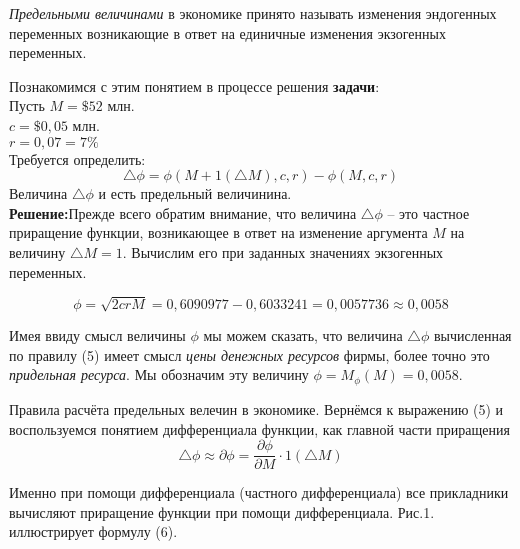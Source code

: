 \documentclass[12pt,a4paper]{article}
\begin{document}
\textit{Предельными величинами} в экономике принято называть изменения эндогенных переменных возникающие в ответ на единичные изменения экзогенных переменных. 

Познакомимся с этим понятием в процессе решения \textbf{задачи}:\\
Пусть $M = \$52$ млн.\\
$c = \$ 0,05$ млн. \\
$r = 0,07 = 7\%$\\
Требуется определить: \\
\begin{equation}
\triangle \phi = \phi(M+1(\triangle M), c, r) - \phi(M,c,r)
\end{equation}
Величина $\triangle \phi$ и есть предельный величинина.\\
\textbf{Решение:}Прежде всего обратим внимание, что величина $\triangle \phi$ -- это частное приращение функции, возникающее в ответ на изменение аргумента $M$ на величину $\triangle M = 1$. Вычислим его при заданных значениях экзогенных переменных.

$$\phi = \sqrt{2crM} = 0,6090977 - 0,6033241 = 0,0057736 \approx 0,0058$$

Имея ввиду смысл величины $\phi$ мы можем сказать, что величина $\triangle \phi$ вычисленная по правилу (5) имеет смысл \textit{цены денежных ресурсов} фирмы, более точно это \textit{придельная ресурса}. Мы обозначим эту величину $\phi = M_{\phi}(M) = 0,0058$. 

Правила расчёта предельных велечин в экономике. Вернёмся к выражению (5) и воспользуемся понятием дифференциала функции, как главной части приращения 
\begin{equation}
\triangle \phi \approx \partial \phi = \frac{\partial \phi}{\partial M} \cdot 1(\triangle M)
\end{equation}

Именно при помощи дифференциала (частного дифференциала) все прикладники вычисляют приращение функции при помощи дифференциала. Рис.1. иллюстрирует формулу (6). 

\end{document}
